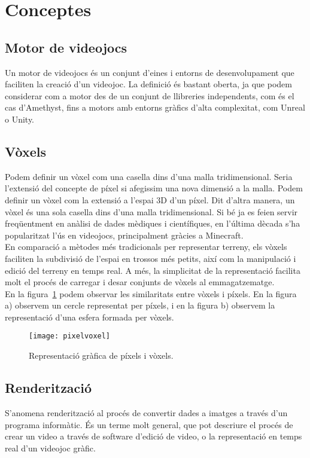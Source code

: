 \section{Conceptes}
\subsection{Motor de videojocs}
Un motor de videojocs és un conjunt d'eines i entorns de desenvolupament que faciliten la creació d'un videojoc. La definició és bastant oberta, ja que podem considerar com a motor des de un conjunt de llibreries independents, com és el cas d'Amethyst, fins a motors amb entorns gràfics d'alta complexitat, com Unreal o Unity.

\subsection{Vòxels}
Podem definir un vòxel com una casella dins d'una malla tridimensional. Seria l'extensió del concepte de píxel si afegissim una nova dimensió a la malla. Podem definir un vòxel com la extensió a l'espai 3D d'un píxel. Dit d'altra manera, un vòxel és una sola casella dins d'una malla tridimensional. Si bé ja es feien servir freqüentment en anàlisi de dades mèdiques i científiques, en l'última dècada s'ha popularitzat l'ús en videojocs, principalment gràcies a Minecraft.
\\
En comparació a mètodes més tradicionals per representar terreny, els vòxels faciliten la subdivisió de l'espai en trossos més petits, així com la manipulació i edició del terreny en temps real. A més, la simplicitat de la representació facilita molt el procés de carregar i desar conjunts de vòxels al emmagatzematge.
\\
En la figura~\ref{pixelvoxel} podem observar les similaritats entre vòxels i píxels. En la figura a) observem un cercle representat per píxels, i en la figura b) observem la representació d'una esfera formada per vòxels.


\begin{figure}[h]
  \centering
  \texttt{[image: pixelvoxel]}
  \label{pixelvoxel}
  \caption{Representació gràfica de píxels i vòxels.}
\end{figure}
\subsection{Renderització}
S'anomena renderització al procés de convertir dades a imatges a través d'un programa informàtic. És un terme molt general, que pot descriure el procés de crear un video a través de software d'edició de video, o la representació en temps real d'un videojoc gràfic.
